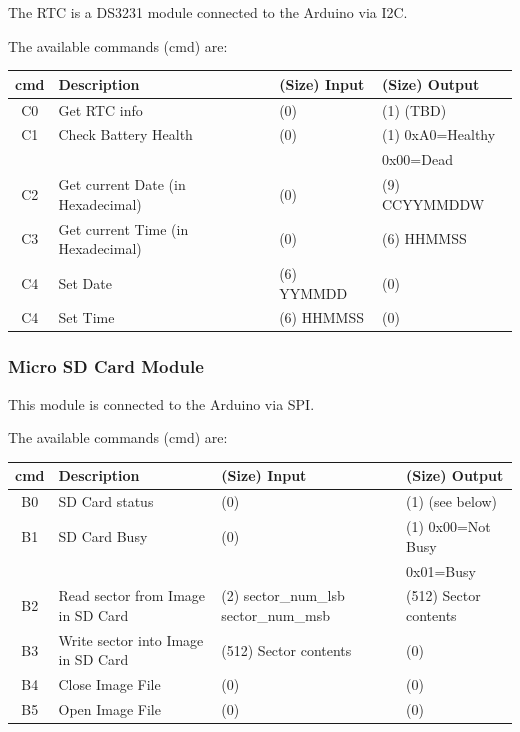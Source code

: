 \documentclass[a4paper,11pt]{article}
\begin{document}
    The RTC is a DS3231 module connected to the Arduino via I2C.

    The available commands (cmd) are:

    \begin{tabular}{| c | m{3.8cm} | m{3cm} | m{3.5cm} | }
        \hline
        \rowcolor{lightgray}
        cmd & Description & (Size) Input & (Size) Output\\
        \hline
        C0 & Get RTC info & (0) & (1) (TBD)\\
        \hline
        C1 & Check Battery Health & (0) & (1) 0xA0=Healthy\\
           &                      &     &     0x00=Dead\\
        \hline
        C2 & Get current Date (in Hexadecimal) & (0) & (9) CCYYMMDDW\\
        \hline
        C3 & Get current Time (in Hexadecimal) & (0) & (6) HHMMSS\\
        \hline
        C4 & Set Date & (6) YYMMDD & (0)\\
        \hline
        C4 & Set Time & (6) HHMMSS & (0)\\
        \hline
    \end{tabular}

    \subsubsection{Micro SD Card Module}

    This module is connected to the Arduino via SPI.

    The available commands (cmd) are:

    \begin{tabular}{| c | m{3.8cm} | m{3cm} | m{3.5cm} | }
        \hline
        \rowcolor{lightgray}
        cmd & Description & (Size) Input & (Size) Output\\
        \hline
        B0 & SD Card status & (0) & (1) (see below)\\
        \hline
        B1 & SD Card Busy & (0) & (1) 0x00=Not Busy\\
           &              &     &     0x01=Busy\\
        \hline
        B2 & Read sector from Image in SD Card & (2) sector\_num\_lsb sector\_num\_msb & (512) Sector contents\\
        \hline
        B3 & Write sector into Image in SD Card & (512) Sector contents & (0) \\
        \hline
        B4 & Close Image File & (0) & (0)\\
        \hline
        B5 & Open Image File & (0) & (0)\\
        \hline
    \end{tabular}
\end{document}
